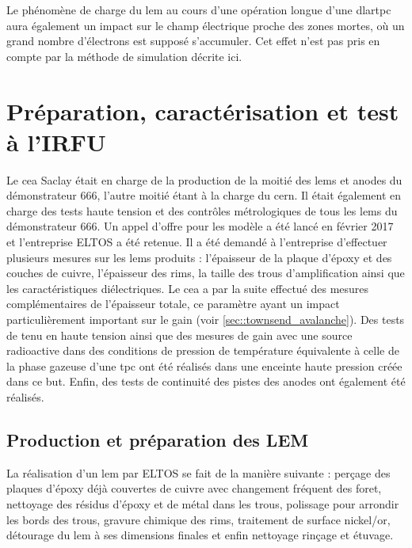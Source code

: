             Le phénomène de charge du \gls{lem} au cours d'une opération longue d'une \gls{dlartpc} aura également un impact sur le champ électrique proche des zones mortes, où un grand nombre d'électrons est supposé s'accumuler. Cet effet n'est pas pris en compte par la méthode de simulation décrite ici.
        
    \section{Préparation, caractérisation et test à l'IRFU}
    
        Le \gls{cea} Saclay était en charge de la production de la moitié des \glspl{lem} et anodes du démonstrateur 666, l'autre moitié étant à la charge du \gls{cern}. Il était également en charge des tests haute tension et des contrôles métrologiques de tous les \glspl{lem} du démonstrateur 666. Un appel d'offre pour les modèle a été lancé en février 2017 et l'entreprise ELTOS a été retenue. Il a été demandé à l'entreprise d'effectuer plusieurs mesures sur les \glspl{lem} produits : l'épaisseur de la plaque d'époxy et des couches de cuivre, l'épaisseur des rims, la taille des trous d'amplification ainsi que les caractéristiques diélectriques. Le \gls{cea} a par la suite effectué des mesures complémentaires de l'épaisseur totale, ce paramètre ayant un impact particulièrement important sur le gain (voir \autoref{sec::townsend_avalanche}). Des tests de tenu en haute tension ainsi que des mesures de gain avec une source radioactive dans des conditions de pression de température équivalente à celle de la phase gazeuse d'une \gls{tpc} ont été réalisés dans une enceinte haute pression créée dans ce but. Enfin, des tests de continuité des pistes des anodes ont également été réalisés.
        
        \subsection{Production et préparation des LEM}
        
            La réalisation d'un \gls{lem} par ELTOS se fait de la manière suivante : perçage des plaques d'époxy déjà couvertes de cuivre avec changement fréquent des foret, nettoyage des résidus d'époxy et de métal dans les trous, polissage pour arrondir les bords des trous, gravure chimique des rims, traitement de surface nickel/or, détourage du \gls{lem} à ses dimensions finales et enfin nettoyage rinçage et étuvage.
                
